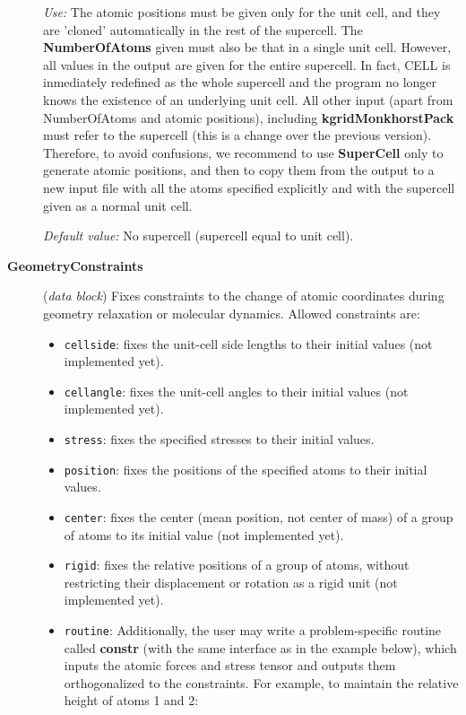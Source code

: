 \documentclass[11pt]{article}
\begin{document}
\begin{description}
{\it Use:} The atomic positions must be given only for the unit cell,
and they are 'cloned' automatically in the rest of the supercell.
The {\bf NumberOfAtoms} given must also be that in a single unit cell.
However, all values in the output are given for the entire supercell. 
In fact, CELL is inmediately redefined as the whole supercell and the 
program no longer knows the existence of an underlying unit cell.
All other input (apart from NumberOfAtoms and atomic positions), 
including {\bf kgridMonkhorstPack} must refer to the supercell 
(this is a change over the previous version). Therefore, to avoid
confusions, we recommend to use {\bf SuperCell} only to
generate atomic positions, and then to copy them from the output
to a new input file with all the atoms specified explicitly and
with the supercell given as a normal unit cell.

{\it Default value:} No supercell (supercell equal to unit cell).


\item[{\bf GeometryConstraints}] ({\it data block}) 
Fixes constraints to the change of atomic coordinates during
geometry relaxation or molecular dynamics. Allowed constraints are:
\begin{itemize}
\item {\tt cellside}: fixes the unit-cell side lengths to
their initial values (not implemented yet).
\item {\tt cellangle}: fixes the unit-cell angles to
their initial values (not implemented yet).
\item {\tt stress}: fixes the specified stresses to
their initial values.
\item {\tt position}: fixes the positions of the specified atoms to
their initial values.
\item {\tt center}: fixes the center (mean position, not center of
mass) of a group of atoms to its initial value (not implemented yet).
\item {\tt rigid}: fixes the relative positions of a group of atoms,
without restricting their displacement or rotation as a rigid unit
(not implemented yet).
\item {\tt routine}: Additionally, the user may write a 
problem-specific routine called {\bf constr} (with the same 
interface as in the example below), which inputs the atomic
forces and stress tensor and outputs them orthogonalized to the
constraints. For example, to maintain the relative height of 
atoms 1 and 2:


\end{itemize}
\end{description}
\end{document}
